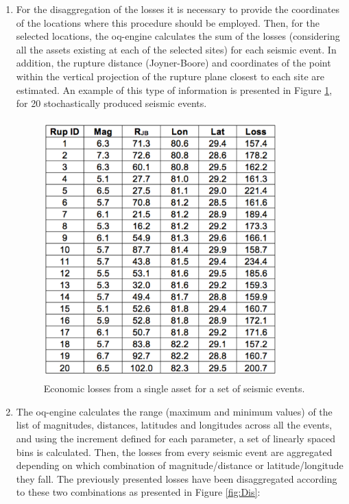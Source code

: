 \begin{enumerate}

\item For the disaggregation of the losses it is necessary to provide the coordinates of the locations where this procedure should be employed. Then, for the selected locations, the oq-engine calculates the sum of the losses (considering all the assets existing at each of the selected sites) for each seismic event. In addition, the rupture distance (Joyner-Boore) and coordinates of the point within the vertical projection of the rupture plane closest to each site are estimated. An example of this type of information is presented in Figure \ref{fig:SetLosses}, for 20 stochastically produced seismic events.

\begin{figure}[ht]
\centering
\includegraphics[width=9cm,height=10cm]{./figures/risk/SetLosses.eps} 
\caption{Economic losses from a single asset for a set of seismic events.}
\label{fig:SetLosses}
\end{figure} 

\item The oq-engine calculates the range (maximum and minimum values) of the list of magnitudes, distances, latitudes and longitudes across all the events, and using the increment defined for each parameter, a set of linearly spaced bins is calculated. Then, the losses from every seismic event are aggregated depending on which combination of magnitude/distance or latitude/longitude they fall. The previously presented losses have been disaggregated according to these two combinations as presented in Figure \ref{fig:Dis}:


\end{enumerate}
